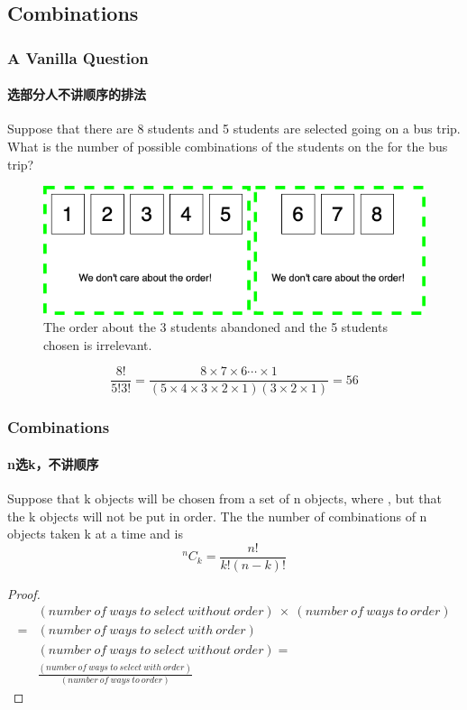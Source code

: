 \documentclass[
	11pt, %
	handout,
]{beamer}
\begin{document}




\subsection{Combinations}

 
 \begin{frame}
	\frametitle{A Vanilla Question} %
	\framesubtitle{选部分人不讲顺序的排法}
	 Suppose that there are 8 students and 5 students are selected going on a bus trip. What is  the
number of possible combinations of the students on the for the bus trip?

	\begin{figure}
		\includegraphics[width=0.5\linewidth]{Combination_8_5.png}
		\caption{The order about the  3 students abandoned and the 5 students chosen is irrelevant.}
	\end{figure}
	\begin{equation}
		\frac{8!}{5! 3!} = \frac{8\times7\times6\cdots\times1}{(5\times4\times3\times2\times1)(3\times2\times1)} = 56
	\end{equation}
\end{frame}


\begin{frame}
	\frametitle{Combinations} %
	\framesubtitle{n选k，不讲顺序}
	\begin{definition}
		Suppose that k objects will be chosen from a set of n
		objects, where , but that the k objects will not be put in order. The
		 the number of combinations of n objects taken k at a time and is \\
		\begin{equation*}
		  ^nC_k =\frac{n!}{k!(n-k)!}
		\end{equation*}
	\end{definition}

	\begin{proof}
		\begin{equation*}
			\begin{aligned}
				&(number\ of\ ways\ to\ select\ without\ order)\ \times\ (number\ of\ ways\ to\ order)\\ =
&(number\ of\ ways\ to\ select\ with\ order)\\
&(number\ of\ ways\ to\ select\ without\ order) =\\
&\frac{(number\ of\ ways\ to\ select\ with\ order)}{(number\ of\ ways\ to\ order)}
			\end{aligned}
		\end{equation*}
	\end{proof}
\end{frame}
\end{document}

